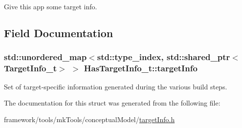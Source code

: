Give this app some target info. 



\subsection{Field Documentation}
\subsubsection[{\texorpdfstring{target\+Info}{targetInfo}}]{\setlength{\rightskip}{0pt plus 5cm}std\+::unordered\+\_\+map$<$std\+::type\+\_\+index, std\+::shared\+\_\+ptr$<${\bf Target\+Info\+\_\+t}$>$ $>$ Has\+Target\+Info\+\_\+t\+::target\+Info}\hypertarget{struct_has_target_info__t_a2cdccf9b03ac2883694527fb288df699}{}\label{struct_has_target_info__t_a2cdccf9b03ac2883694527fb288df699}


Set of target-\/specific information generated during the various build steps. 



The documentation for this struct was generated from the following file\+:\begin{DoxyCompactItemize}
\item 
framework/tools/mk\+Tools/conceptual\+Model/\hyperlink{target_info_8h}{target\+Info.\+h}\end{DoxyCompactItemize}
